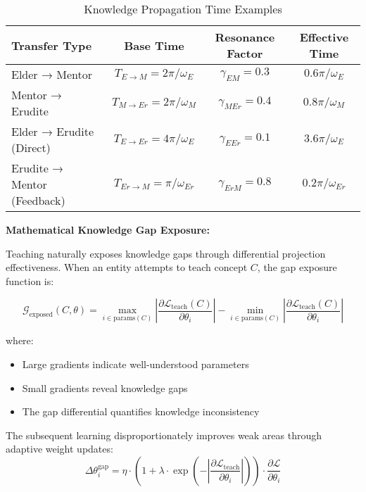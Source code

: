 \begin{table}[h]
\centering
\caption{Knowledge Propagation Time Examples}
\label{tab:propagation_times}
\begin{tabular}{|l|c|c|c|}
\hline
\textbf{Transfer Type} & \textbf{Base Time} & \textbf{Resonance Factor} & \textbf{Effective Time} \\
\hline
Elder → Mentor & $T_{E→M} = 2\pi/\omega_E$ & $\gamma_{EM} = 0.3$ & $0.6\pi/\omega_E$ \\
Mentor → Erudite & $T_{M→Er} = 2\pi/\omega_M$ & $\gamma_{M Er} = 0.4$ & $0.8\pi/\omega_M$ \\
Elder → Erudite (Direct) & $T_{E→Er} = 4\pi/\omega_E$ & $\gamma_{E Er} = 0.1$ & $3.6\pi/\omega_E$ \\
Erudite → Mentor (Feedback) & $T_{Er→M} = \pi/\omega_{Er}$ & $\gamma_{Er M} = 0.8$ & $0.2\pi/\omega_{Er}$ \\
\hline
\end{tabular}
\end{table}

\textbf{Mathematical Knowledge Gap Exposure:}

Teaching naturally exposes knowledge gaps through differential projection effectiveness. When an entity attempts to teach concept $C$, the gap exposure function is:

\begin{equation}
\mathcal{G}_{\text{exposed}}(C, \theta) = \max_{i \in \text{params}(C)} \left| \frac{\partial \mathcal{L}_{\text{teach}}(C)}{\partial \theta_i} \right| - \min_{i \in \text{params}(C)} \left| \frac{\partial \mathcal{L}_{\text{teach}}(C)}{\partial \theta_i} \right|
\end{equation}

where:
\begin{itemize}
    \item Large gradients indicate well-understood parameters
    \item Small gradients reveal knowledge gaps
    \item The gap differential quantifies knowledge inconsistency
\end{itemize}

The subsequent learning disproportionately improves weak areas through adaptive weight updates:
\begin{equation}
\Delta\theta_i^{\text{gap}} = \eta \cdot \left(1 + \lambda \cdot \exp\left(-\left|\frac{\partial \mathcal{L}_{\text{teach}}}{\partial \theta_i}\right|\right)\right) \cdot \frac{\partial \mathcal{L}}{\partial \theta_i}
\end{equation}

